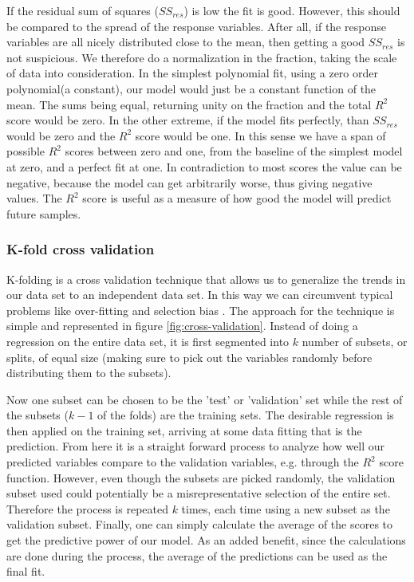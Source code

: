 	If the residual sum of squares ($SS_{res}$) is low the fit is good. However, this should be compared to the spread of the response variables. After all, if the response variables are all nicely distributed close to the mean, then getting a good $SS_{res}$ is not suspicious. We therefore do a normalization in the fraction, taking the scale of data into consideration. In the simplest polynomial fit, using a zero order polynomial(a constant), our model would just be a constant function of the mean. The sums being equal, returning unity on the fraction and the total $R^2$ score would be zero. In the other extreme, if the model fits perfectly, than $SS_{res}$ would be zero and the $R^2$ score would be one. In this sense we have a span of possible $R^2$ scores between zero and one, from the baseline of the simplest model at zero, and a perfect fit at one. In contradiction to most scores the value can be negative, because the model can get arbitrarily worse, thus giving negative values.
	The $R^2$ score is useful as a measure of how good the model will predict future samples.

\subsubsection{K-fold cross validation}\label{sec:cross_validation}
	K-folding is a cross validation technique that allows us to generalize the trends in our data set to an independent data set. In this way we can circumvent typical problems like over-fitting and selection bias \cite{james2013introduction}. The approach for the technique is simple and represented in figure \ref{fig:cross-validation}. Instead of doing a regression on the entire data set, it is first segmented into $k$ number of subsets, or splits, of equal size (making sure to pick out the variables randomly before distributing them to the subsets).

	Now one subset can be chosen to be the 'test' or 'validation' set while the rest of the subsets ($k-1$ of the folds) are the training sets. The desirable regression is then applied on the training set, arriving at some data fitting that is the prediction. From here it is a straight forward process to analyze how well our predicted variables compare to the validation variables, e.g. through the $R^2$ score function. However, even though the subsets are picked randomly, the validation subset used could potentially be a misrepresentative selection of the entire set. Therefore the process is repeated $k$ times, each time using a new subset as the validation subset. Finally, one can simply calculate the average of the scores to get the predictive power of our model. As an added benefit, since the calculations are done during the process, the average of the predictions can be used as the final fit.
	
